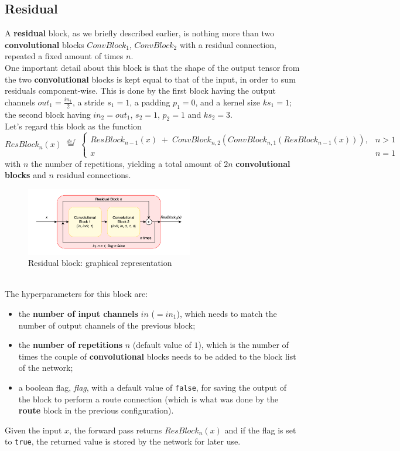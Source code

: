 \documentclass[../report.tex]{subfiles}
\begin{document}
\subsection{Residual}\label{ss:network-blocks-residual}
A \textbf{residual} block, as we briefly described earlier, is nothing more than two \textbf{convolutional} blocks $ConvBlock_1$, $ConvBlock_2$ with a residual connection, repeated a fixed amount of times $n$.\\
One important detail about this block is that the shape of the output tensor from the two \textbf{convolutional} blocks is kept equal to that of the input, in order to sum residuals component-wise.
This is done by the first block having the output channels $out_1 = \frac{in_1}{2}$, a stride $s_1 = 1$, a padding $p_1 = 0$, and a kernel size $ks_1 = 1$;
the second block having $in_2 = out_1$, $s_2 =1$, $p_2 = 1$ and $ks_2 = 3$.\\
Let's regard this block as the function 
$$ResBlock_n(x) \; \stackrel{def}{=} \;
\begin{cases}
    ResBlock_{n-1}(x) \; + \; ConvBlock_{n,2}(ConvBlock_{n,1}(ResBlock_{n-1}(x))), & n > 1 \\
    x & n = 1
\end{cases}$$
with $n$ the number of repetitions, yielding a total amount of $2n$ \textbf{convolutional blocks} and $n$ residual connections.
\begin{figure}[h]
    \centering
    \includegraphics[width=0.65\textwidth]{assets/images/residual_block}
    \caption{Residual block: graphical representation}\label{img:residual_block}
\end{figure}\\
The hyperparameters for this block are:
\begin{itemize}
    \item the \textbf{number of input channels} $in$ ($= in_1$), which needs to match the number of output channels of the previous block;
    \item the \textbf{number of repetitions} $n$ (default value of $1$), which is the number of times the couple of \textbf{convolutional} blocks needs to be added to the block list of the network;
    \item a boolean flag, \textit{flag}, with a default value of \texttt{false}, for saving the output of the block to perform a route connection (which is what was done by the \textbf{route} block in the previous configuration).
\end{itemize}
Given the input $x$, the forward pass returns $ResBlock_n(x)$ and if the flag is set to \texttt{true}, the returned value is stored by the network for later use.
\end{document}
